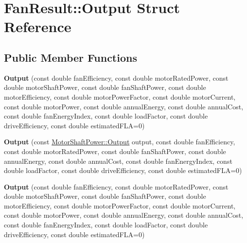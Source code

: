 \hypertarget{struct_fan_result_1_1_output}{}\section{Fan\+Result\+:\+:Output Struct Reference}
\label{struct_fan_result_1_1_output}
\subsection*{Public Member Functions}
\begin{DoxyCompactItemize}
\item 
\mbox{\label{struct_fan_result_1_1_output_a557a94bc157a5e71cd8e57b5bdf6c1e7}} 
{\bfseries Output} (const double fan\+Efficiency, const double motor\+Rated\+Power, const double motor\+Shaft\+Power, const double fan\+Shaft\+Power, const double motor\+Efficiency, const double motor\+Power\+Factor, const double motor\+Current, const double motor\+Power, const double annual\+Energy, const double annual\+Cost, const double fan\+Energy\+Index, const double load\+Factor, const double drive\+Efficiency, const double estimated\+F\+LA=0)
\item 
\mbox{\label{struct_fan_result_1_1_output_a1f99eb8da726ccb297ae40d77b461de0}} 
{\bfseries Output} (const \hyperlink{struct_motor_shaft_power_1_1_output}{Motor\+Shaft\+Power\+::\+Output} output, const double fan\+Efficiency, const double motor\+Rated\+Power, const double fan\+Shaft\+Power, const double annual\+Energy, const double annual\+Cost, const double fan\+Energy\+Index, const double load\+Factor, const double drive\+Efficiency, const double estimated\+F\+LA=0)
\item 
\mbox{\label{struct_fan_result_1_1_output_a557a94bc157a5e71cd8e57b5bdf6c1e7}} 
{\bfseries Output} (const double fan\+Efficiency, const double motor\+Rated\+Power, const double motor\+Shaft\+Power, const double fan\+Shaft\+Power, const double motor\+Efficiency, const double motor\+Power\+Factor, const double motor\+Current, const double motor\+Power, const double annual\+Energy, const double annual\+Cost, const double fan\+Energy\+Index, const double load\+Factor, const double drive\+Efficiency, const double estimated\+F\+LA=0)
\item 
\mbox{\label{struct_fan_result_1_1_output_a1f99eb8da726ccb297ae40d77b461de0}} 

\end{DoxyCompactItemize}
